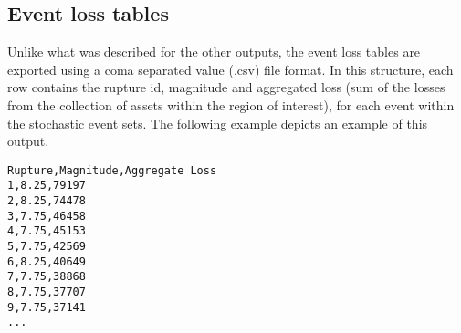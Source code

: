 \subsection{Event loss tables}
Unlike what was described for the other outputs, the event loss tables are exported using a coma separated value (.csv) file format. In this structure, each row contains the rupture id, magnitude and aggregated loss (sum of the losses from the collection of assets within the region of interest), for each event within the stochastic event sets. The following example depicts an example of this output.

\begin{Verbatim}[frame=single, commandchars=\\\{\}, samepage=false]
Rupture,Magnitude,Aggregate Loss
1,8.25,79197
2,8.25,74478
3,7.75,46458
4,7.75,45153
5,7.75,42569
6,8.25,40649
7,7.75,38868
8,7.75,37707
9,7.75,37141
...
\end{Verbatim}
